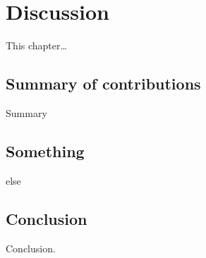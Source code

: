 
\inbpdocument

\chapter{Discussion}
\label{ch:discussion}

This chapter\dots

\section{Summary of contributions}

Summary

\section{Something}

else

\section{Conclusion}

Conclusion.

\outbpdocument{


}
